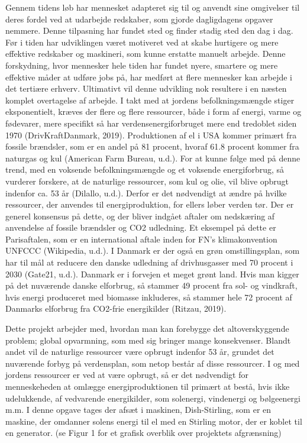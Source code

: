 \documentclass[SRC.tex]{subfiles}
\begin{document}
	Gennem tidens løb har mennesket adapteret sig til og anvendt sine omgivelser til deres fordel ved at udarbejde redskaber, som gjorde dagligdagens opgaver nemmere. Denne tilpasning har fundet sted og finder stadig sted den dag i dag. Før i tiden har udviklingen været motiveret ved at skabe hurtigere og mere effektive redskaber og maskineri, som kunne erstatte manuelt arbejde. Denne forskydning, hvor mennesker hele tiden har fundet nyere, smartere og mere effektive måder at udføre jobs på, har medført at flere mennesker kan arbejde i det tertiære erhverv. Ultimativt vil denne udvikling nok resultere i en næsten komplet overtagelse af arbejde. I takt med at jordens befolkningsmængde stiger eksponentielt, kræves der flere og flere ressourcer, både i form af energi, varme og fødevarer, mere specifikt så har verdensenergiforbruget mere end tredoblet siden 1970 (DrivKraftDanmark, 2019). Produktionen af el i USA kommer primært fra fossile brændsler, som er en andel på 81 procent, hvoraf 61.8 procent kommer fra naturgas og kul (American Farm Bureau, u.d.). For at kunne følge med på denne trend, med en voksende befolkningsmængde og et voksende energiforbrug, så vurderer forskere, at de naturlige ressourcer, som kul og olie, vil blive opbrugt indenfor ca. 53 år (Dilallo, u.d.).  Derfor er det nødvendigt at ændre på hvilke ressourcer, der anvendes til energiproduktion, for ellers løber verden tør. Der er generel konsensus på dette, og der bliver indgået aftaler om nedskæring af anvendelse af fossile brændsler og CO2 udledning. Et eksempel på dette er Parisaftalen, som er en international aftale inden for FN’s klimakonvention UNFCCC (Wikipedia, u.d.). I Danmark er der også en grøn omstillingsplan, som har til mål at reducere den danske udledning af drivhusgasser med 70 procent i 2030 (Gate21, u.d.). Danmark er i forvejen et meget grønt land. Hvis man kigger på det nuværende danske elforbrug, så stammer 49 procent fra sol- og vindkraft, hvis energi produceret med biomasse inkluderes, så stammer hele 72 procent af Danmarks elforbrug fra CO2-frie energikilder (Ritzau, 2019).  
	
	Dette projekt arbejder med, hvordan man kan forebygge det altoverskyggende problem; global opvarmning, som med sig bringer mange konsekvenser. Blandt andet vil de naturlige ressourcer være opbrugt indenfor 53 år, grundet det nuværende forbyg på verdensplan, som netop består af disse ressourcer. I og med jordens ressourcer er ved at være opbrugt, så er det nødvendigt for menneskeheden at omlægge energiproduktionen til primært at bestå, hvis ikke udelukkende, af vedvarende energikilder, som solenergi, vindenergi og bølgeenergi m.m. I denne opgave tages der afsæt i maskinen, Dish-Stirling, som er en maskine, der omdanner solens energi til el med en Stirling motor, der er koblet til en generator. (se Figur 1 for et grafisk overblik over projektets afgrænsning) 
\end{document}
